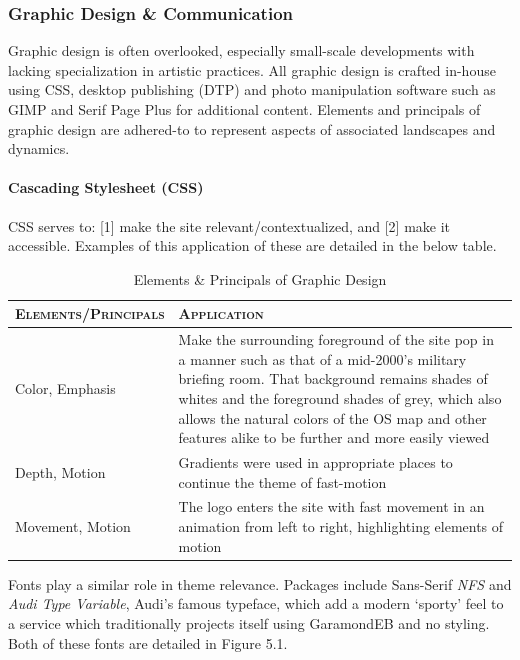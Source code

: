 \documentclass[11pt, english]{article}
\begin{document}
		\subsubsection{Graphic Design \& Communication}

	Graphic design is often overlooked, especially small-scale developments with lacking specialization in artistic practices. All graphic design is crafted in-house using CSS, desktop publishing (DTP) and photo manipulation software such as GIMP and Serif Page Plus for additional content. Elements and principals of graphic design are adhered-to to represent aspects of associated landscapes and dynamics.

			\paragraph{Cascading Stylesheet (CSS)}

	CSS serves to: [1] make the site relevant/contextualized, and [2] make it accessible. Examples of this application of these are detailed in the below table.

	\begin{table}[h]
		\scriptsize
		\renewcommand{\arraystretch}{1.25}
	\begin{center}
	\begin{tabular}{l|p{10cm}}
		\textsc{Elements/Principals} & \textsc{Application}\\
		\hline
		\hline
		Color, Emphasis & Make the surrounding foreground of the site pop in a manner such as that of a mid-2000's military briefing room. That background remains shades of whites and the foreground shades of grey, which also allows the natural colors of the OS map and other features alike to be further and more easily viewed\\
		Depth, Motion & Gradients were used in appropriate places to continue the theme of fast-motion\\
		Movement, Motion & The logo enters the site with fast movement in an animation from left to right, highlighting elements of motion\\
		\hline
		\hline
	\end{tabular}
		\caption{Elements \& Principals of Graphic Design}
	\end{center}
	\end{table}

	Fonts play a similar role in theme relevance. Packages include Sans-Serif \textit{NFS} and \textit{Audi Type Variable}, Audi's famous typeface, which add a modern `sporty' feel to a service which traditionally projects itself using GaramondEB and no styling. Both of these fonts are detailed in Figure 5.1.
\end{document}
